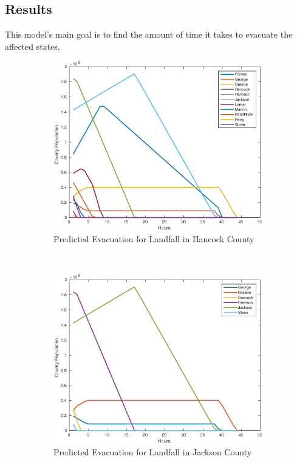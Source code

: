 \documentclass[titlepage]{article}
\begin{document}
  \subsection{Results}
    This model's main goal is to find the amount of time it takes to evacuate the affected states.
    \begin{figure}
      \center
      \begin{subfigure}[b]{0.5\textwidth}
        \center
        \includegraphics[width=\linewidth]{figures/pred_hancock-crop.pdf}
        \caption{Predicted Evacuation for Landfall in Hancock County}
      \end{subfigure}~
      \begin{subfigure}[b]{0.5\textwidth}
        \center
        \includegraphics[width=\linewidth]{figures/pred_jackson-crop.pdf}
        \caption{Predicted Evacuation for Landfall in Jackson County}
      \end{subfigure}
      \caption{}
      \label{}
    \end{figure}
\end{document}
